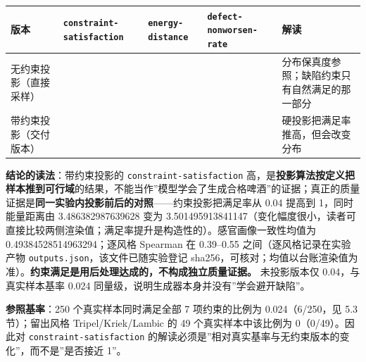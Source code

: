 \documentclass[
  11pt,
]{ctexart}
\newcounter{none} %
\begin{document}
{\def\LTcaptype{none} %
\begin{longtable}[]{@{}
  >{\raggedright\arraybackslash}p{}
  >{\raggedright\arraybackslash}p{}
  >{\raggedright\arraybackslash}p{}
  >{\raggedright\arraybackslash}p{}
  >{\raggedright\arraybackslash}p{}@{}}
\toprule\noalign{}
\begin{minipage}[b]{\linewidth}\raggedright
版本
\end{minipage} & \begin{minipage}[b]{\linewidth}\raggedright
\texttt{constraint-satisfaction}
\end{minipage} & \begin{minipage}[b]{\linewidth}\raggedright
\texttt{energy-distance}
\end{minipage} & \begin{minipage}[b]{\linewidth}\raggedright
\texttt{defect-nonworsen-rate}
\end{minipage} & \begin{minipage}[b]{\linewidth}\raggedright
解读
\end{minipage} \\
\midrule\noalign{}
\endhead
\bottomrule\noalign{}
\endlastfoot
无约束投影（直接采样） & 0.04 & 3.486382987639628 & 0.14285714285714285
& 分布保真度参照；缺陷约束只有自然满足的那一部分 \\
带约束投影（交付版本） & 1 & 3.501495913841147 & 1 &
硬投影把满足率推高，但会改变分布 \\
\end{longtable}
}

\textbf{结论的读法}：带约束投影的 \texttt{constraint-satisfaction}
高，是\textbf{投影算法按定义把样本推到可行域}的结果，不能当作''模型学会了生成合格啤酒''的证据；真正的质量证据是\textbf{同一实验内投影前后的对照}------约束投影把满足率从
0.04 提高到 1，同时能量距离由 3.486382987639628 变为
3.501495913841147（变化幅度很小，读者可直接比较两侧渲染值；满足率提升是构造性的）。感官画像一致性均值为
0.49384528514963294；逐风格 Spearman 在 0.39--0.55
之间（逐风格记录在实验产物 \texttt{outputs.json}，该文件已随实验登记
sha256，可核对；均值以台账渲染值为准）。\textbf{约束满足是用后处理达成的，不构成独立质量证据。}
未投影版本仅 0.04，与真实样本基率 0.024
同量级，说明生成器本身并没有''学会避开缺陷''。

\textbf{参照基率}：250 个真实样本同时满足全部 7 项约束的比例为
0.024（6/250，见 5.3 节）；留出风格 Tripel/Kriek/Lambic 的 49
个真实样本中该比例为 0（0/49）。因此对 \texttt{constraint-satisfaction}
的解读必须是''相对真实基率与无约束版本的变化''，而不是''是否接近 1''。
\end{document}
